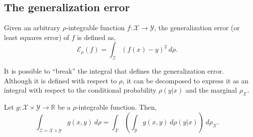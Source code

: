 \subsection{The generalization error} \label{sec_generalizationError}

\begin{definition}  \label{def_generalizationError}
Given an arbitrary $\rho$-integrable function $f : \mathcal{X} \to \mathcal{Y}$, the generalization error (or least squares error) of $f$ is defined as,
\begin{equation} \label{eq_generalizationError}
  \mathcal{E}_{\rho}(f) = \int_{\mathcal{Z}} (f(x)-y)^2 \ d\rho.
\end{equation}
\end{definition}

It is possible to ``break'' the integral that defines the generalization error. Although it is defined with respect to $\rho$, it can be decomposed to express it as an integral with respect to the conditional probability $\rho(y|x)$ and the marginal $\rho_{\mathcal{X}}$.

\begin{proposition} \label{prop_fubini}
  Let $g: \mathcal{X} \times \mathcal{Y} \to \mathbb{R}$ be a $\rho$-integrable function. Then,
  \begin{equation*}
    \int_{\mathcal{Z}=\mathcal{X}\times \mathcal{Y}} g(x,y) \ d\rho = \int_{\mathcal{X}} \left( \int_{\mathcal{Y}} g(x,y) \ d\rho(y|x) \right) \ d\rho_{\mathcal{X}}.
  \end{equation*} 
\end{proposition}


